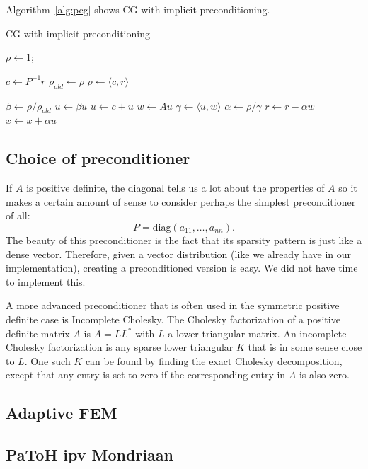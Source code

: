 \documentclass[11pt]{amsart}
\theoremstyle{definition}
\begin{document}
Algorithm~\ref{alg:pcg} shows CG with implicit preconditioning. \cite[Lect.~10]{sleij}
\begin{algorithm}
  \caption{CG with implicit preconditioning \cite[Lect.~10]{sleij}}
  \label{alg:pcg}
    $\rho \gets 1$;
		 {
       $c \gets P^{-1} r$\;
       $\rho_{old} \gets \rho$\;
       $\rho \gets \langle c, r \rangle$\;
      
			  {
         $\beta \gets \rho/\rho_{old}$\;
         $u \gets \beta u$\;
			}
       $u \gets c + u$\;
       $w \gets Au$\;
       $\gamma \gets \langle u, w \rangle$\;
       $\alpha \gets \rho/\gamma$\;
       $r \gets r - \alpha w$\;
       $x \gets x + \alpha u$\;
		 }
\end{algorithm}

\subsection{Choice of preconditioner}
If $A$ is positive definite, the diagonal tells us a lot about the properties of $A$ so it makes a certain amount of sense to consider perhaps the simplest preconditioner of all:
\[
  P = \text{diag}(a_{11}, \ldots, a_{nn}).
\]
The beauty of this preconditioner is the fact that its sparsity pattern is just like a dense vector. Therefore, given a vector distribution (like we already have in our implementation), creating a preconditioned version is easy. We did not have time to implement this.

A more advanced preconditioner that is often used in the symmetric positive definite case is Incomplete Cholesky.  The Cholesky factorization of a positive definite matrix $A$ is $A = LL^*$ with $L$ a lower triangular matrix. An incomplete Cholesky factorization is any sparse lower triangular $K$ that is in some sense close to $L$. One such $K$ can be found by finding the exact Cholesky decomposition, except that any entry is set to zero if the corresponding entry in $A$ is also zero. \cite[\S11.5.8]{golub}
\subsection{Adaptive FEM}
\subsection{PaToH ipv Mondriaan}




\end{document}
